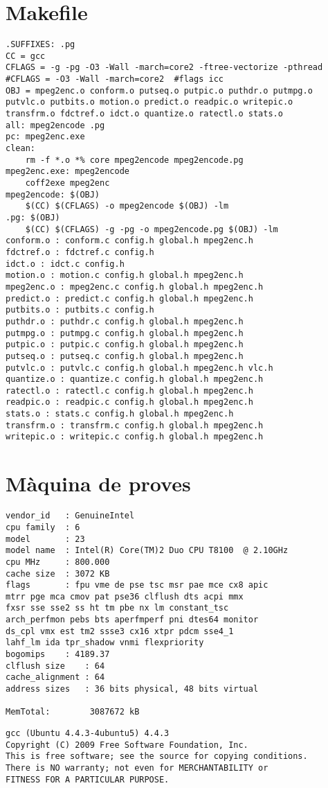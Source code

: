\appendix
\chapter{Makefile}
\begin{lstlisting}
.SUFFIXES: .pg
CC = gcc
CFLAGS = -g -pg -O3 -Wall -march=core2 -ftree-vectorize -pthread
#CFLAGS = -O3 -Wall -march=core2  #flags icc
OBJ = mpeg2enc.o conform.o putseq.o putpic.o puthdr.o putmpg.o 
putvlc.o putbits.o motion.o predict.o readpic.o writepic.o 
transfrm.o fdctref.o idct.o quantize.o ratectl.o stats.o
all: mpeg2encode .pg
pc: mpeg2enc.exe
clean:
	rm -f *.o *% core mpeg2encode mpeg2encode.pg
mpeg2enc.exe: mpeg2encode
	coff2exe mpeg2enc
mpeg2encode: $(OBJ)
	$(CC) $(CFLAGS) -o mpeg2encode $(OBJ) -lm
.pg: $(OBJ)
	$(CC) $(CFLAGS) -g -pg -o mpeg2encode.pg $(OBJ) -lm
conform.o : conform.c config.h global.h mpeg2enc.h 
fdctref.o : fdctref.c config.h 
idct.o : idct.c config.h 
motion.o : motion.c config.h global.h mpeg2enc.h 
mpeg2enc.o : mpeg2enc.c config.h global.h mpeg2enc.h 
predict.o : predict.c config.h global.h mpeg2enc.h 
putbits.o : putbits.c config.h 
puthdr.o : puthdr.c config.h global.h mpeg2enc.h 
putmpg.o : putmpg.c config.h global.h mpeg2enc.h 
putpic.o : putpic.c config.h global.h mpeg2enc.h 
putseq.o : putseq.c config.h global.h mpeg2enc.h 
putvlc.o : putvlc.c config.h global.h mpeg2enc.h vlc.h 
quantize.o : quantize.c config.h global.h mpeg2enc.h 
ratectl.o : ratectl.c config.h global.h mpeg2enc.h 
readpic.o : readpic.c config.h global.h mpeg2enc.h 
stats.o : stats.c config.h global.h mpeg2enc.h 
transfrm.o : transfrm.c config.h global.h mpeg2enc.h 
writepic.o : writepic.c config.h global.h mpeg2enc.h 
\end{lstlisting}

\chapter{Màquina de proves}
\begin{lstlisting}
vendor_id	: GenuineIntel
cpu family	: 6
model		: 23
model name	: Intel(R) Core(TM)2 Duo CPU T8100  @ 2.10GHz
cpu MHz		: 800.000
cache size	: 3072 KB
flags		: fpu vme de pse tsc msr pae mce cx8 apic 
mtrr pge mca cmov pat pse36 clflush dts acpi mmx 
fxsr sse sse2 ss ht tm pbe nx lm constant_tsc 
arch_perfmon pebs bts aperfmperf pni dtes64 monitor 
ds_cpl vmx est tm2 ssse3 cx16 xtpr pdcm sse4_1 
lahf_lm ida tpr_shadow vnmi flexpriority
bogomips	: 4189.37
clflush size	: 64
cache_alignment	: 64
address sizes	: 36 bits physical, 48 bits virtual

MemTotal:        3087672 kB

\end{lstlisting}


\begin{lstlisting}
gcc (Ubuntu 4.4.3-4ubuntu5) 4.4.3
Copyright (C) 2009 Free Software Foundation, Inc.
This is free software; see the source for copying conditions.  
There is NO warranty; not even for MERCHANTABILITY or 
FITNESS FOR A PARTICULAR PURPOSE.
\end{lstlisting}
